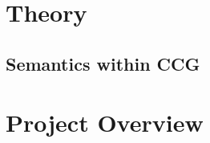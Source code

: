 
\pagebreak

\section{Theory}
    
    
    
    \subsection{Semantics within CCG}
        
        
        
    
    

\section{Project Overview}
    
    
    

\begin{appendices} \appendix
    
\end{appendices}

\printbibliography[heading=bibintoc,title={References}]
